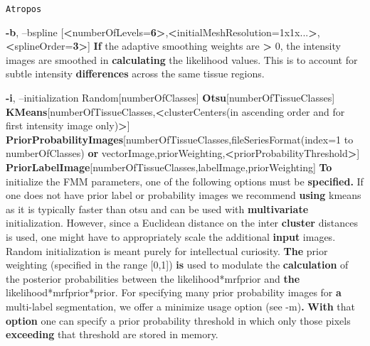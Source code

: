 \documentclass[ignorenonframetext,]{beamer}
\newenvironment{Shaded}{\begin{snugshade}}{\end{snugshade}}
\newcommand{\KeywordTok}[1]{\textcolor[rgb]{0.13,0.29,0.53}{\textbf{{#1}}}}
\newcommand{\NormalTok}[1]{{#1}}
\begin{document}
\begin{frame}[fragile]{\texttt{Atropos}}
\begin{Shaded}
\begin{Highlighting}[]
     \KeywordTok{-b}\NormalTok{, --bspline [}\KeywordTok{<}\NormalTok{numberOfLevels=}\KeywordTok{6>}\NormalTok{,}\KeywordTok{<}\NormalTok{initialMeshResolution=1x1x...}\KeywordTok{>}\NormalTok{,}\KeywordTok{<}\NormalTok{splineOrder=}\KeywordTok{3>}\NormalTok{]}
          \KeywordTok{If} \NormalTok{the adaptive smoothing weights are }\KeywordTok{>} \NormalTok{0, the intensity images are smoothed in}
          \KeywordTok{calculating} \NormalTok{the likelihood values. This is to account for subtle intensity}
          \KeywordTok{differences} \NormalTok{across the same tissue regions.}

     \KeywordTok{-i}\NormalTok{, --initialization Random[numberOfClasses]}
                          \KeywordTok{Otsu}\NormalTok{[numberOfTissueClasses]}
                          \KeywordTok{KMeans}\NormalTok{[numberOfTissueClasses,}\KeywordTok{<}\NormalTok{clusterCenters(in ascending order and for first intensity image only)}\KeywordTok{>}\NormalTok{]}
                          \KeywordTok{PriorProbabilityImages}\NormalTok{[numberOfTissueClasses,fileSeriesFormat(index=1 to numberOfClasses) }\KeywordTok{or} \NormalTok{vectorImage,priorWeighting,}\KeywordTok{<}\NormalTok{priorProbabilityThreshold}\KeywordTok{>}\NormalTok{]}
                          \KeywordTok{PriorLabelImage}\NormalTok{[numberOfTissueClasses,labelImage,priorWeighting]}
          \KeywordTok{To} \NormalTok{initialize the FMM parameters, one of the following options must be}
          \KeywordTok{specified.} \NormalTok{If one does not have prior label or probability images we recommend}
          \KeywordTok{using} \NormalTok{kmeans as it is typically faster than otsu and can be used with}
          \KeywordTok{multivariate} \NormalTok{initialization. However, since a Euclidean distance on the inter}
          \KeywordTok{cluster} \NormalTok{distances is used, one might have to appropriately scale the additional}
          \KeywordTok{input} \NormalTok{images. Random initialization is meant purely for intellectual curiosity.}
          \KeywordTok{The} \NormalTok{prior weighting (specified in the range [0,1]) }\KeywordTok{is} \NormalTok{used to modulate the}
          \KeywordTok{calculation} \NormalTok{of the posterior probabilities between the likelihood*mrfprior and}
          \KeywordTok{the} \NormalTok{likelihood*mrfprior*prior. For specifying many prior probability images for}
          \KeywordTok{a} \NormalTok{multi-label segmentation, we offer a minimize usage option (see -m)}\KeywordTok{.} \KeywordTok{With} \NormalTok{that}
          \KeywordTok{option} \NormalTok{one can specify a prior probability threshold in which only those pixels}
          \KeywordTok{exceeding} \NormalTok{that threshold are stored in memory.}


\end{Highlighting}
\end{Shaded}
\end{frame}
\end{document}
